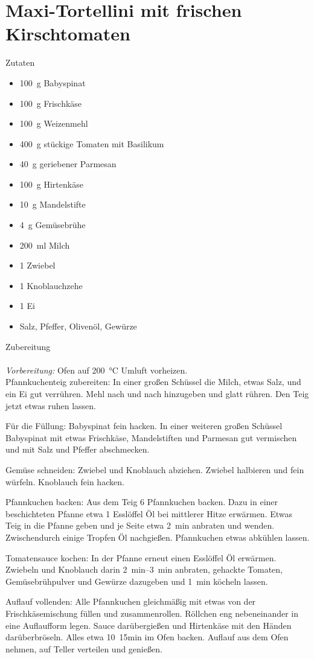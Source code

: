 \section*{Maxi-Tortellini mit frischen Kirschtomaten}
\ihead{}\ohead{}
\cfoot{}
{\Large Zutaten}
\begin{multicols}{2}
\begin{itemize}
    \item \SI{100}{g} Babyspinat
    \item \SI{100}{g} Frischkäse
    \item \SI{100}{g} Weizenmehl
    \item \SI{400}{g} stückige Tomaten mit Basilikum
    \item \SI{40}{g} geriebener Parmesan
    \item \SI{100}{g} Hirtenkäse
    \item \SI{10}{g} Mandelstifte
    \item \SI{4}{g} Gemüsebrühe 
    \item \SI{200}{ml} Milch
    \item \num{1} Zwiebel
    \item \num{1} Knoblauchzehe
    \item \num{1} Ei
    \item Salz, Pfeffer, Olivenöl, Gewürze
\end{itemize}
\end{multicols}
\noindent
{\Large Zubereitung}\\
\\
\textit{Vorbereitung:} Ofen auf \SI{200}{\celsius} Umluft vorheizen.\\
Pfannkuchenteig zubereiten: In einer großen Schüssel die Milch, etwas Salz, und ein Ei gut verrühren. 
Mehl nach und nach hinzugeben und glatt rühren. 
Den Teig jetzt etwas ruhen lassen.

Für die Füllung: Babyspinat fein hacken. In einer weiteren großen Schüssel Babyspinat mit etwas Frischkäse, Mandelstiften und Parmesan gut vermischen und mit Salz und Pfeffer abschmecken.

Gemüse schneiden: Zwiebel und Knoblauch abziehen. Zwiebel halbieren und fein würfeln. 
Knoblauch fein hacken. 

Pfannkuchen backen: Aus dem Teig \num{6} Pfannkuchen backen. 
Dazu in einer beschichteten Pfanne etwa \num{1} Esslöffel Öl bei mittlerer Hitze erwärmen. 
Etwas Teig in die Pfanne geben und je Seite etwa \SI{2}{min} anbraten und wenden.
Zwischendurch einige Tropfen Öl nachgießen.
Pfannkuchen etwas abkühlen lassen.

Tomatensauce kochen: In der Pfanne erneut einen Esslöffel Öl erwärmen. 
Zwiebeln und Knoblauch darin \SIrange{2}{3}{min} anbraten, gehackte Tomaten, Gemüsebrühpulver und Gewürze dazugeben und \SI{1}{min} köcheln lassen.

Auflauf vollenden: Alle Pfannkuchen gleichmäßig mit etwas von der Frischkäsemischung füllen und zusammenrollen. 
Röllchen eng nebeneinander in eine Auflaufform legen.
Sauce darübergießen und Hirtenkäse mit den Händen darüberbröseln. 
Alles etwa \SI{10}{15}{min} im Ofen backen. 
Auflauf aus dem Ofen nehmen, auf Teller verteilen und genießen. 
